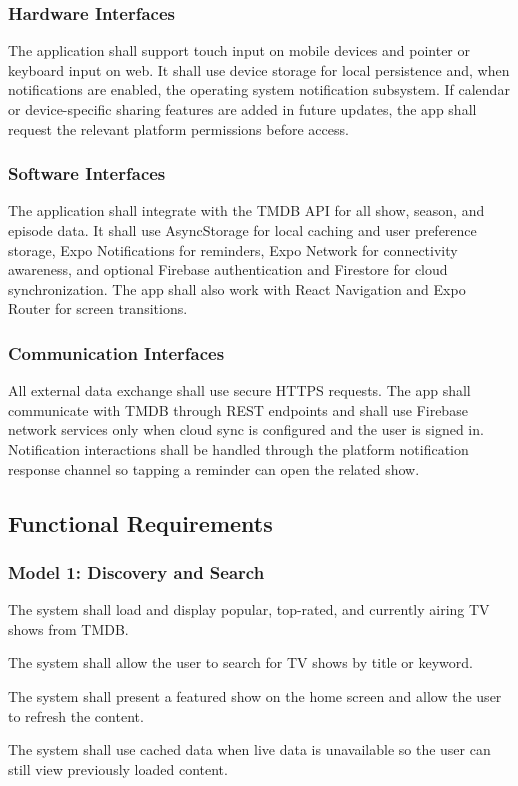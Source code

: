 \subsubsection{Hardware Interfaces}
The application shall support touch input on mobile devices and pointer or keyboard input on web. It shall use device storage for local persistence and, when notifications are enabled, the operating system notification subsystem. If calendar or device-specific sharing features are added in future updates, the app shall request the relevant platform permissions before access.

\subsubsection{Software Interfaces}
The application shall integrate with the TMDB API for all show, season, and episode data. It shall use AsyncStorage for local caching and user preference storage, Expo Notifications for reminders, Expo Network for connectivity awareness, and optional Firebase authentication and Firestore for cloud synchronization. The app shall also work with React Navigation and Expo Router for screen transitions.

\subsubsection{Communication Interfaces}
All external data exchange shall use secure HTTPS requests. The app shall communicate with TMDB through REST endpoints and shall use Firebase network services only when cloud sync is configured and the user is signed in. Notification interactions shall be handled through the platform notification response channel so tapping a reminder can open the related show.

\subsection{Functional Requirements}

\subsubsection{Model 1: Discovery and Search}
\begin{description}[leftmargin=1.8cm, style=nextline]
	\item[FR-1.1] The system shall load and display popular, top-rated, and currently airing TV shows from TMDB.
	\item[FR-1.2] The system shall allow the user to search for TV shows by title or keyword.
	\item[FR-1.3] The system shall present a featured show on the home screen and allow the user to refresh the content.
	\item[FR-1.4] The system shall use cached data when live data is unavailable so the user can still view previously loaded content.
\end{description}

